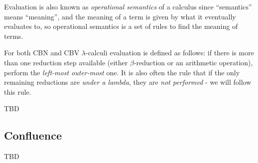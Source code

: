 \documentclass{article}
\newcommand{\lam}{\lambda}
\begin{document}
Evaluation is also known as \textit{operational semantics} of a calculus since ``semantics'' means ``meaning'', and the meaning of a term is given by what it eventually evaluates to, so operational semantics is a set of rules to find the meaning of terms. 

For both CBN and CBV $\lam$-calculi evaluation is defined as follows: if there is more than one reduction step available (either $\beta$-reduction or an arithmetic operation), perform the \textit{left-most outer-most} one. It is also often the rule that if the only remaining reductions are \textit{under a lambda}, they are \textit{not performed} - we will follow this rule. 

TBD

\subsection{Confluence}\label{confluence}

TBD
\end{document}
